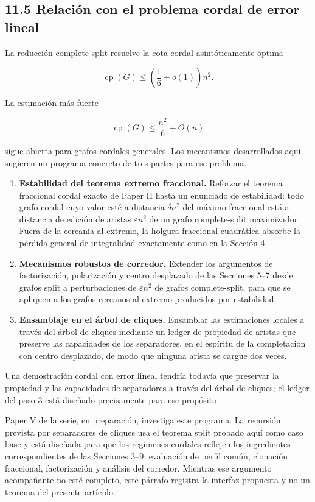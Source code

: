 \documentclass[
  11pt,
]{article}
\begin{document}
\subsection{11.5 Relación con el problema cordal de error lineal}\label{relaciuxf3n-con-el-problema-cordal-de-error-lineal}

La reducción complete-split resuelve la cota cordal asintóticamente óptima

\[
\operatorname{cp}(G)
\le
\left(\frac16+o(1)\right)n^2.
\]

La estimación más fuerte

\[
\operatorname{cp}(G)
\le
\frac{n^2}{6}+O(n)
\]

sigue abierta para grafos cordales generales. Los mecanismos desarrollados aquí sugieren un programa concreto de tres partes para ese problema.

\begin{enumerate}
\def\labelenumi{\arabic{enumi}.}
\item
  \textbf{Estabilidad del teorema extremo fraccional.} Reforzar el teorema fraccional cordal exacto de Paper II hasta un enunciado de estabilidad: todo grafo cordal cuyo valor esté a distancia \(\delta n^2\) del máximo fraccional está a distancia de edición de aristas \(\varepsilon n^2\) de un grafo complete-split maximizador. Fuera de la cercanía al extremo, la holgura fraccional cuadrática absorbe la pérdida general de integralidad exactamente como en la Sección 4.
\item
  \textbf{Mecanismos robustos de corredor.} Extender los argumentos de factorización, polarización y centro desplazado de las Secciones 5--7 desde grafos split a perturbaciones de \(\varepsilon n^2\) de grafos complete-split, para que se apliquen a los grafos cercanos al extremo producidos por estabilidad.
\item
  \textbf{Ensamblaje en el árbol de cliques.} Ensamblar las estimaciones locales a través del árbol de cliques mediante un ledger de propiedad de aristas que preserve las capacidades de los separadores, en el espíritu de la completación con centro desplazado, de modo que ninguna arista se cargue dos veces.
\end{enumerate}

Una demostración cordal con error lineal tendría todavía que preservar la propiedad y las capacidades de separadores a través del árbol de cliques; el ledger del paso 3 está diseñado precisamente para ese propósito.

Paper V de la serie, en preparación, investiga este programa. La recursión prevista por separadores de cliques usa el teorema split probado aquí como caso base y está diseñada para que los regímenes cordales reflejen los ingredientes correspondientes de las Secciones 3--9: evaluación de perfil común, clonación fraccional, factorización y análisis del corredor. Mientras ese argumento acompañante no esté completo, este párrafo registra la interfaz propuesta y no un teorema del presente artículo.
\end{document}
